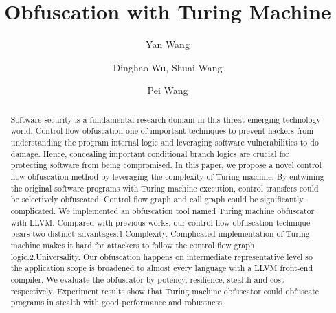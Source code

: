 \documentclass[lnicst]{svmultln}
\begin{document}
%
\mainmatter              %
%
\title{Obfuscation with Turing Machine}
%
%
\author{Yan Wang \and Dinghao Wu,
Shuai Wang \and Pei Wang}
%
%
%
\institute{Pennsylvania State University, State College,PA 16801, USA,\\
\email{ybw5084@ist.psu.edu} %
}
\maketitle              

\begin{abstract}        %
Software security is a fundamental research domain in this threat emerging
technology world. Control flow obfuscation one of important techniques to
prevent hackers from understanding the program internal logic and leveraging
software vulnerabilities to do damage. Hence, concealing important conditional
branch logics are crucial for protecting software from being compromised. In
this paper, we propose a novel control flow obfuscation method by leveraging the
complexity of Turing machine. By entwining the original software programs with
Turing machine execution, control transfers could be selectively obfuscated.
Control flow graph and call graph could be significantly complicated. We
implemented an obfuscation tool named Turing machine obfuscator with LLVM.
Compared with previous works, our control flow obfuscation technique bears two
distinct advantages:1.Complexity. Complicated implementation of Turing machine
makes it hard for attackers to follow the control flow graph
logic.2.Universality. Our obfuscation happens on intermediate representative
level so the application scope is broadened to almost every language with a LLVM
front-end compiler. We evaluate the obfuscator by potency, resilience, stealth
and cost respectively. Experiment results show that Turing machine obfuscator
could obfuscate programs in stealth with good performance and robustness.
\end{abstract}
%
\end{document}
